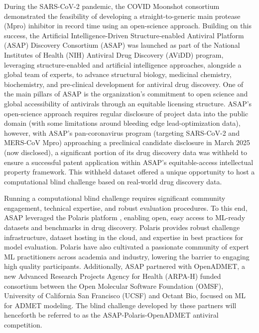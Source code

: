 \documentclass[journal=jcim,manuscript=article]{achemso}
\begin{document}
During the SARS-CoV-2 pandemic, the COVID Moonshot consortium demonstrated the feasibility of developing a straight-to-generic main protease (Mpro) inhibitor in record time using an open-science approach\cite{boby_2023}. Building on this success, the Artificial Intelligence-Driven Structure-enabled Antiviral Platform (ASAP) Discovery Consortium\cite{ASAP_website} (ASAP) was launched as part of the National Institutes of Health (NIH) Antiviral Drug Discovery (AViDD) program\cite{AVIDD_niaid_2022}, leveraging structure-enabled and artificial intelligence approaches, alongside a global team of experts, to advance structural biology, medicinal chemistry, biochemistry, and pre-clinical development for antiviral drug discovery. One of the main pillars of ASAP is the organization's commitment to open science and global accessibility of antivirals through an equitable licensing structure\cite{griffen_2024}. ASAP's open-science approach requires regular disclosure of project data into the public domain (with some limitations around bleeding edge lead-optimization data), however, with ASAP's pan-coronavirus program (targeting SARS-CoV-2 and MERS-CoV Mpro\cite{sars_mers_tcp}) approaching a preclinical candidate disclosure in March 2025 (now disclosed)\cite{griffen_2025_acs}, a significant portion of its drug discovery data was withheld to ensure a successful patent application within ASAP's equitable-access intellectual property framework. This withheld dataset offered a unique opportunity to host a computational blind challenge based on real-world drug discovery data.


Running a computational blind challenge requires significant community engagement, technical expertise, and robust evaluation procedures. To this end, ASAP leveraged the Polaris platform \cite{wognum_call_2024, Polaris_website, wognum_polaris-hubpolaris_2025}, enabling open, easy access to ML-ready datasets and benchmarks in drug discovery. Polaris provides robust challenge infrastructure, dataset hosting in the cloud, and expertise in best practices for model evaluation. Polaris have also cultivated a passionate community of expert ML practitioners across academia and industry, lowering the barrier to engaging high quality participants. Additionally, ASAP partnered with OpenADMET, a new Advanced Research Projects Agency for Health (ARPA-H)\cite{ARPAH_website} funded consortium between the Open Molecular Software Foundation (OMSF)\cite{OMSF_website}, University of California San Francisco (UCSF) and Octant Bio\cite{Octant_website}, focused on ML for ADMET modeling. The blind challenge developed by these partners will henceforth be referred to as the ASAP-Polaris-OpenADMET antiviral competition.
\end{document}
